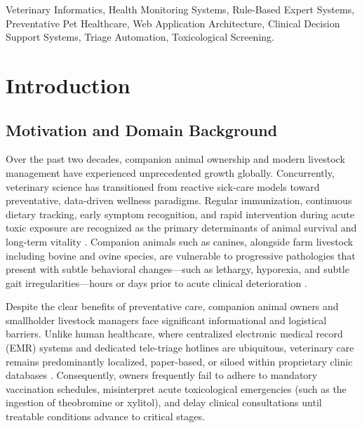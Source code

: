 \documentclass[conference]{IEEEtran}
\begin{document}
\begin{IEEEkeywords}
Veterinary Informatics, Health Monitoring Systems, Rule-Based Expert Systems, Preventative Pet Healthcare, Web Application Architecture, Clinical Decision Support Systems, Triage Automation, Toxicological Screening.
\end{IEEEkeywords}

\section{Introduction}
\subsection{Motivation and Domain Background}
Over the past two decades, companion animal ownership and modern livestock management have experienced unprecedented growth globally. Concurrently, veterinary science has transitioned from reactive sick-care models toward preventative, data-driven wellness paradigms. Regular immunization, continuous dietary tracking, early symptom recognition, and rapid intervention during acute toxic exposure are recognized as the primary determinants of animal survival and long-term vitality \cite{hall2012}. Companion animals such as canines, alongside farm livestock including bovine and ovine species, are vulnerable to progressive pathologies that present with subtle behavioral changes---such as lethargy, hyporexia, and subtle gait irregularities---hours or days prior to acute clinical deterioration \cite{steiner2011}.

Despite the clear benefits of preventative care, companion animal owners and smallholder livestock managers face significant informational and logistical barriers. Unlike human healthcare, where centralized electronic medical record (EMR) systems and dedicated tele-triage hotlines are ubiquitous, veterinary care remains predominantly localized, paper-based, or siloed within proprietary clinic databases \cite{christopher2011}. Consequently, owners frequently fail to adhere to mandatory vaccination schedules, misinterpret acute toxicological emergencies (such as the ingestion of theobromine or xylitol), and delay clinical consultations until treatable conditions advance to critical stages.
\end{document}
